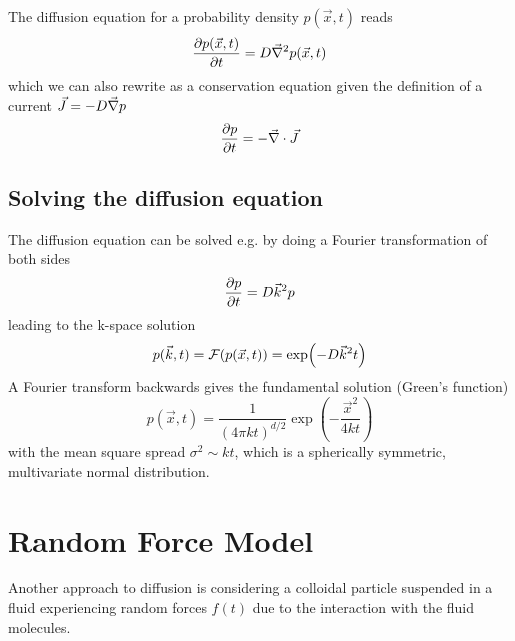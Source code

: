 \documentclass{notebook}
\begin{document}
\newpage
%
\begin{theorem}
	The diffusion equation for a probability density $p(\vec{x}, t)$ reads
	\begin{equation}
	\pdv{p(\vec{x}, t)}{t} = D \vec{\nabla}^2 p(\vec{x}, t)
	\end{equation}
	which we can also rewrite as a conservation equation given the definition of a current $\vec{J} = -D \vec{\nabla} p$
	\begin{equation}
	\pdv{p}{t} = - \vec{\nabla} \cdot \vec{J}
	\end{equation}
\end{theorem}
%

\subsection*{Solving the diffusion equation}

The diffusion equation can be solved e.g. by doing a Fourier transformation of both sides
%
\begin{equation}
\pdv{p}{t} =  D \vec{k}^2 p
\end{equation}
%
leading to the k-space solution
%
\begin{equation}
p(\vec{k},t) = \mathcal{F}(p(\vec{x},t)) = \exp(-D \vec{k}^2 t)
\end{equation}
%
A Fourier transform backwards gives the fundamental solution (Green's function)
%
\begin{equation}
p(\vec{x},t) = \frac{1}{(4 \pi k t)^{d/2}} \exp(-\frac{\vec{x}^2}{4 k t})
\end{equation}
%
with the mean square spread $\sigma^2 \sim k t$, which is a spherically symmetric, multivariate normal distribution.

\newpage
\section{Random Force Model}

Another approach to diffusion is considering a colloidal particle suspended in a fluid experiencing random forces $f(t)$ due to the interaction with the fluid molecules. 
\end{document}
